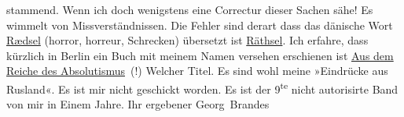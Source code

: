 \begin{ledgroupsized}[t]{13cm}
               stammend. Wenn
                    ich doch wenigstens eine Correctur dieser Sachen sähe! Es wimmelt von
                    Missverständnissen. Die Fehler sind derart dass das dänische Wort \uline{Rædsel} (horror,
                    horreur, Schrecken) übersetzt ist \uline{Räthsel}.\hspace*{5em} Ich erfahre, dass kürzlich in Berlin ein Buch mit meinem Namen versehen erschienen ist
                        \uline{Aus dem Reiche des Absolutismus} (!)
                    Welcher Titel. Es sind wohl meine »Eindrücke aus
                        Rusland«. Es ist mir nicht geschickt worden. \introOben{}Es ist
                        der 9\textsuperscript{te} nicht autorisirte Band von mir in Einem
                        Jahre.\introOben{}\pend
           \pstart Ihr ergebener \spacefill\mbox{Georg Brandes}\pend{}          \endnumbering{}\end{ledgroupsized}  \newcommand{\dateiname}{L00600}\newcommand{\titel}{Georg Brandes an Arthur Schnitzler, 6. 10. 1896}\newcommand{\editorInnen}{Martin Anton Müller und Gerd-Hermann Susen}
      